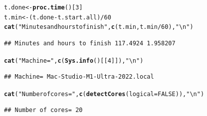 \documentclass[9pt]{article}\usepackage[]{graphicx}\usepackage[]{xcolor}
\makeatletter
\newcommand{\hlnum}[1]{\textcolor[rgb]{0.686,0.059,0.569}{#1}}%
\newcommand{\hlstr}[1]{\textcolor[rgb]{0.192,0.494,0.8}{#1}}%
\newcommand{\hlopt}[1]{\textcolor[rgb]{0,0,0}{#1}}%
\newcommand{\hlstd}[1]{\textcolor[rgb]{0.345,0.345,0.345}{#1}}%
\newcommand{\hlkwb}[1]{\textcolor[rgb]{0.69,0.353,0.396}{#1}}%
\newcommand{\hlkwc}[1]{\textcolor[rgb]{0.333,0.667,0.333}{#1}}%
\newcommand{\hlkwd}[1]{\textcolor[rgb]{0.737,0.353,0.396}{\textbf{#1}}}%
\newenvironment{kframe}{%
 \def\at@end@of@kframe{}%
 \ifinner\ifhmode%
  \def\at@end@of@kframe{\end{minipage}}%
  \begin{minipage}{\columnwidth}%
 \fi\fi%
 \def\FrameCommand##1{\hskip\@totalleftmargin \hskip-\fboxsep
 \colorbox{shadecolor}{##1}\hskip-\fboxsep
     \hskip-\linewidth \hskip-\@totalleftmargin \hskip\columnwidth}%
 \MakeFramed {\advance\hsize-\width
   \@totalleftmargin\z@ \linewidth\hsize
   \@setminipage}}%
 {\par\unskip\endMakeFramed%
 \at@end@of@kframe}
\newenvironment{knitrout}{}{} %
\theoremstyle{definition}
\theoremstyle{remark}
\makeatother
\begin{document}
\begin{knitrout}
\color{fgcolor}\begin{kframe}
\begin{alltt}
\hlstd{t.done} \hlkwb{<-} \hlkwd{proc.time}\hlstd{()[}\hlnum{3}\hlstd{]}
\hlstd{t.min} \hlkwb{<-} \hlstd{(t.done} \hlopt{-} \hlstd{t.start.all)}\hlopt{/}\hlnum{60}
\hlkwd{cat}\hlstd{(}\hlstr{"Minutes and hours to finish"}\hlstd{,} \hlkwd{c}\hlstd{(t.min, t.min}\hlopt{/}\hlnum{60}\hlstd{),} \hlstr{"\textbackslash{}n"}\hlstd{)}
\end{alltt}
\begin{verbatim}
## Minutes and hours to finish 117.4924 1.958207
\end{verbatim}
\begin{alltt}
\hlkwd{cat}\hlstd{(}\hlstr{"Machine="}\hlstd{,} \hlkwd{c}\hlstd{(}\hlkwd{Sys.info}\hlstd{()[[}\hlnum{4}\hlstd{]]),} \hlstr{"\textbackslash{}n"}\hlstd{)}
\end{alltt}
\begin{verbatim}
## Machine= Mac-Studio-M1-Ultra-2022.local
\end{verbatim}
\begin{alltt}
\hlkwd{cat}\hlstd{(}\hlstr{"Number of cores="}\hlstd{,} \hlkwd{c}\hlstd{(}\hlkwd{detectCores}\hlstd{(}\hlkwc{logical} \hlstd{=} \hlnum{FALSE}\hlstd{)),} \hlstr{"\textbackslash{}n"}\hlstd{)}
\end{alltt}
\begin{verbatim}
## Number of cores= 20
\end{verbatim}
\end{kframe}
\end{knitrout}
\end{document}
